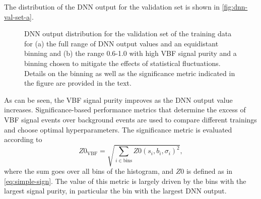 The distribution of the DNN output for the validation set is shown in \cref{fig:dnn-val-set-a}.
\begin{figure}[ht]
    \caption[DNN output distributions for the validation set of the training data.]{DNN output distribution for the validation set of the training data for (a) the full range of DNN output values and an equidistant binning and (b) the range 0.6-1.0 with high VBF signal purity and a binning chosen to mitigate the effects of statistical fluctuations. Details on the binning as well as the significance metric indicated in the figure are provided in the text.}
    \label{fig:dnn-val-set}
\end{figure}
As can be seen, the VBF signal purity improves as the DNN output value increases.
Significance-based performance metrics that determine the excess of VBF signal events over background events are used to compare different trainings and choose optimal hyperparameters.
The significance metric is evaluated according to
\begin{equation}
    \label{eq:significance-performance-metric}
    Z0_{\mathrm{VBF}} = \sqrt{ \sum_{i \in \text{bins}} Z0(s_{i}, b_{i}, \sigma_{i})^2 },
\end{equation}
where the sum goes over all bins of the histogram, and $Z0$ is defined as in \cref{eq:simple-sign}.
The value of this metric is largely driven by the bins with the largest signal purity, in particular the bin with the largest DNN output.

